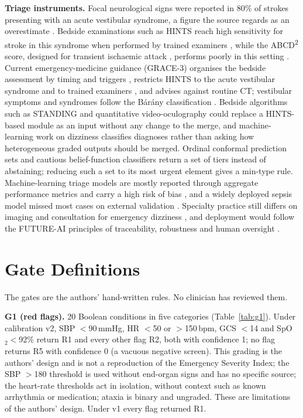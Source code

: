 \documentclass[11pt,a4paper]{article}%
\begin{document}
\textbf{Triage instruments.} Focal neurological signs were reported in 80\% of strokes presenting with an acute vestibular syndrome, a figure the source regards as an overestimate \cite{tarnutzer2011bedside}. Bedside examinations such as HINTS reach high sensitivity for stroke in this syndrome when performed by trained examiners \cite{kattah2009hints,tarnutzer2011bedside,newmantoker2013hints}, while the ABCD\textsuperscript{2} score, designed for transient ischaemic attack \cite{johnston2007validation}, performs poorly in this setting \cite{newmantoker2013hints}. Current emergency-medicine guidance (GRACE-3) organises the bedside assessment by timing and triggers \cite{edlow2023grace3,newman2015timing}, restricts HINTS to the acute vestibular syndrome and to trained examiners \cite{edlow2023grace3,shah2023exam}, and advises against routine CT; vestibular symptoms and syndromes follow the B\'ar\'any classification \cite{bisdorff2009classification}. Bedside algorithms such as STANDING \cite{vanni2017standing} and quantitative video-oculography \cite{newmantoker2013vog} could replace a HINTS-based module as an input without any change to the merge, and machine-learning work on dizziness \cite{zhao2025dizziness,rastall2026ai} classifies diagnoses rather than asking how heterogeneous graded outputs should be merged. Ordinal conformal prediction sets \cite{dey2023conformal} and cautious belief-function classifiers \cite{imoussaten2022cautious} return a set of tiers instead of abstaining; reducing such a set to its most urgent element gives a min-type rule. Machine-learning triage models are mostly reported through aggregate performance metrics and carry a high risk of bias \cite{porto2024triage}, and a widely deployed sepsis model missed most cases on external validation \cite{wong2021epic}. Specialty practice still differs on imaging and consultation for emergency dizziness \cite{puissant2024approach}, and deployment would follow the FUTURE-AI principles of traceability, robustness and human oversight \cite{lekadir2025futureai}.

\section{Gate Definitions}\label{sup:gates}

The gates are the authors' hand-written rules. No clinician has reviewed them.

\textbf{G1 (red flags).} 20 Boolean conditions in five categories (Table~\ref{tab:g1}). Under calibration v2, SBP $<$90\,mmHg, HR $<$50 or $>$150\,bpm, GCS $<$14 and SpO$_2<$92\% return R1 and every other flag R2, both with confidence 1; no flag returns R5 with confidence 0 (a vacuous negative screen). This grading is the authors' design and is not a reproduction of the Emergency Severity Index; the SBP $>$180 threshold is used without end-organ signs and has no specific source; the heart-rate thresholds act in isolation, without context such as known arrhythmia or medication; ataxia is binary and ungraded. These are limitations of the authors' design. Under v1 every flag returned R1.
\end{document}
